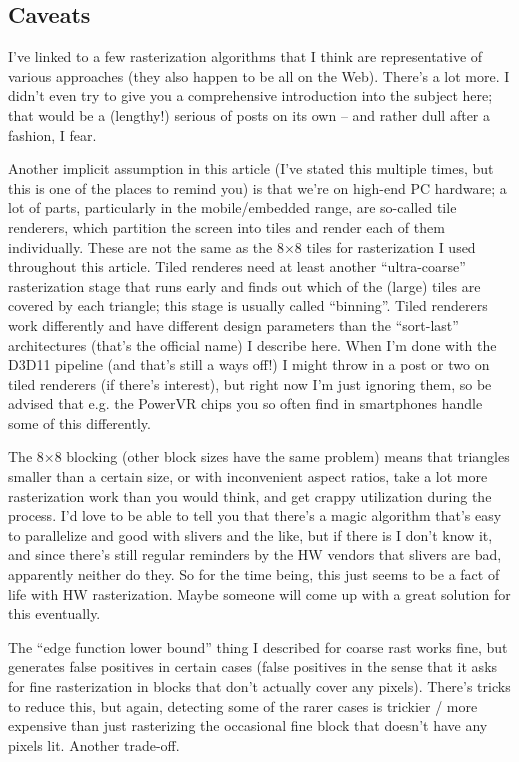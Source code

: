 \documentclass[12pt]{article}
\begin{document}
\subsection{Caveats}
\label{sec:org3cd8e94}

I’ve linked to a few rasterization algorithms that I think are representative of various approaches (they also happen to be all on the Web). There’s a lot more. I didn’t even try to give you a comprehensive introduction into the subject here; that would be a (lengthy!) serious of posts on its own – and rather dull after a fashion, I fear.

Another implicit assumption in this article (I’ve stated this multiple times, but this is one of the places to remind you) is that we’re on high-end PC hardware; a lot of parts, particularly in the mobile/embedded range, are so-called tile renderers, which partition the screen into tiles and render each of them individually. These are not the same as the 8×8 tiles for rasterization I used throughout this article. Tiled renderes need at least another “ultra-coarse” rasterization stage that runs early and finds out which of the (large) tiles are covered by each triangle; this stage is usually called “binning”. Tiled renderers work differently and have different design parameters than the “sort-last” architectures (that’s the official name) I describe here. When I’m done with the D3D11 pipeline (and that’s still a ways off!) I might throw in a post or two on tiled renderers (if there’s interest), but right now I’m just ignoring them, so be advised that e.g. the PowerVR chips you so often find in smartphones handle some of this differently.

The 8×8 blocking (other block sizes have the same problem) means that triangles smaller than a certain size, or with inconvenient aspect ratios, take a lot more rasterization work than you would think, and get crappy utilization during the process. I’d love to be able to tell you that there’s a magic algorithm that’s easy to parallelize and good with slivers and the like, but if there is I don’t know it, and since there’s still regular reminders by the HW vendors that slivers are bad, apparently neither do they. So for the time being, this just seems to be a fact of life with HW rasterization. Maybe someone will come up with a great solution for this eventually.

The “edge function lower bound” thing I described for coarse rast works fine, but generates false positives in certain cases (false positives in the sense that it asks for fine rasterization in blocks that don’t actually cover any pixels). There’s tricks to reduce this, but again, detecting some of the rarer cases is trickier / more expensive than just rasterizing the occasional fine block that doesn’t have any pixels lit. Another trade-off.
\end{document}
